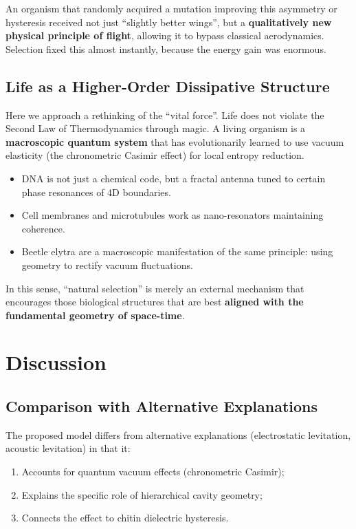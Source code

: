 \documentclass[12pt,a4paper]{article}
\begin{document}
An organism that randomly acquired a mutation improving this asymmetry or hysteresis received not just ``slightly better wings'', but a \textbf{qualitatively new physical principle of flight}, allowing it to bypass classical aerodynamics. Selection fixed this almost instantly, because the energy gain was enormous.

\subsection{Life as a Higher-Order Dissipative Structure}

Here we approach a rethinking of the ``vital force''. Life does not violate the Second Law of Thermodynamics through magic. A living organism is a \textbf{macroscopic quantum system} that has evolutionarily learned to use vacuum elasticity (the chronometric Casimir effect) for local entropy reduction.

\begin{itemize}
    \item DNA is not just a chemical code, but a fractal antenna tuned to certain phase resonances of 4D boundaries.
    \item Cell membranes and microtubules work as nano-resonators maintaining coherence.
    \item Beetle elytra are a macroscopic manifestation of the same principle: using geometry to rectify vacuum fluctuations.
\end{itemize}

In this sense, ``natural selection'' is merely an external mechanism that encourages those biological structures that are best \textbf{aligned with the fundamental geometry of space-time}.

\section{Discussion}

\subsection{Comparison with Alternative Explanations}

The proposed model differs from alternative explanations (electrostatic levitation, acoustic levitation) in that it:
\begin{enumerate}
    \item Accounts for quantum vacuum effects (chronometric Casimir);
    \item Explains the specific role of hierarchical cavity geometry;
    \item Connects the effect to chitin dielectric hysteresis.
\end{enumerate}
\end{document}
